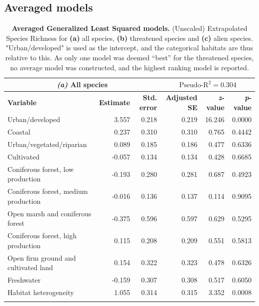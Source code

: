 \documentclass{article}
\begin{document}
\subsection{Averaged models} \label{sec:models}
\begin{table}[h]  %
    \caption{\textbf{Averaged Generalized Least Squared models.} (Unscaled) Extrapolated Species Richness for \textbf{(a)} all species, \textbf{(b)} threatened species and \textbf{(c)} alien species. "Urban/developed" is used as the intercept, and the categorical habitats are thus relative to this. As only one model was deemed ``best'' for the threatened species, no average model was constructed, and the highest ranking model is reported.}
    \label{table:model_parameters}
    \begin{tabular}{l r r r r r}
    \multicolumn{3}{c}{\textbf{\textit{(a)}  All species}} & \multicolumn{3}{c}{$\text{Pseudo-R}^2 = 0.304$} \\
    \hline
    \textbf{Variable} & \textbf{Estimate} & \textbf{Std. error} & \textbf{Adjusted SE} & \textbf{\textit{z}-value} & \textbf{\textit{p}-value} \\
    \hline
    Urban/developed                         & 3.557    & 0.218     & 0.219       & 16.246   & 0.0000    \\
    Coastal                                 & 0.237    & 0.310     & 0.310       & 0.765    & 0.4442    \\
    Urban/vegetated/riparian                & 0.089    & 0.185     & 0.186       & 0.477    & 0.6336    \\
    Cultivated                              & -0.057   & 0.134     & 0.134       & 0.428    & 0.6685    \\
    Coniferous forest, low production       & -0.193   & 0.280     & 0.281       & 0.687    & 0.4923    \\
    Coniferous forest, medium production    & -0.016   & 0.136     & 0.137       & 0.114    & 0.9095    \\
    Open marsh and coniferous forest        & -0.375   & 0.596     & 0.597       & 0.629    & 0.5295    \\
    Coniferous forest, high production      & 0.115    & 0.208     & 0.209       & 0.551    & 0.5813    \\
    Open firm ground and cultivated land    & 0.154    & 0.322     & 0.323       & 0.478    & 0.6326    \\
    Freshwater                              & -0.159   & 0.307     & 0.308       & 0.517    & 0.6050    \\
    Habitat heterogeneity                   & 1.055    & 0.314     & 0.315       & 3.352    & 0.0008    \\
    \hline
    & & & & & \\
    

\end{tabular}
\end{table}
\end{document}
